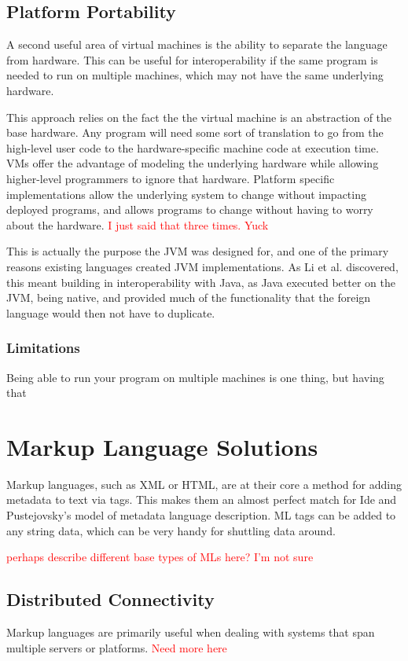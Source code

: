 \documentclass{sig-alternate}
\newcommand{\mycomment}[1]{\textcolor{red}{#1}}
\begin{document}
\subsection*{Platform Portability}
A second useful area of virtual machines is the ability to separate the language from hardware. This can be useful for interoperability if the same program is needed to run on multiple machines, which may not have the same underlying hardware.

This approach relies on the fact the the virtual machine is an abstraction of the base hardware. Any program will need some sort of translation to go from the high-level user code to the hardware-specific machine code at execution time. VMs offer the advantage of modeling the underlying hardware while allowing higher-level programmers to ignore that hardware. Platform specific implementations allow the underlying system to change without impacting deployed programs, and allows programs to change without having to worry about the hardware. \mycomment{I just said that three times. Yuck}

This is actually the purpose the JVM was designed for, and one of the primary reasons existing languages created JVM implementations. As Li et al. discovered, this meant building in interoperability with Java, as Java executed better on the JVM, being native, and provided much of the functionality that the foreign language would then not have to duplicate\cite{Li:2013}.

\subsubsection*{Limitations}
Being able to run your program on multiple machines is one thing, but having that 


\section{Markup Language Solutions}\label{ML}
Markup languages, such as XML or HTML, are at their core a method for adding metadata to text via tags. This makes them an almost perfect match for Ide and Pustejovsky's model of metadata language description. ML tags can be added to any string data, which can be very handy for shuttling data around.

\mycomment{perhaps describe different base types of MLs here? I'm not sure}

\subsection*{Distributed Connectivity}
Markup languages are primarily useful when dealing with systems that span multiple servers or platforms. \mycomment{Need more here}
\end{document}
